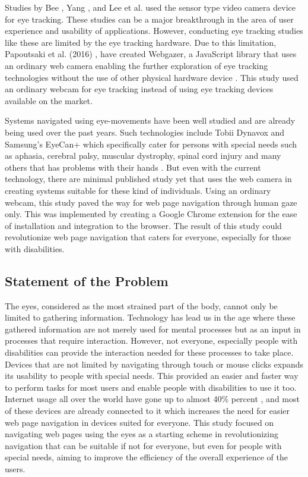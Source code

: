 \documentclass[journal]{./IEEE/IEEEtran}
\begin{document}
Studies by Bee \cite{Bee06etal},  Yang  \cite{Yang2016etal}, and  Lee et al.  \cite{Lee2015etal} used the sensor type video camera device for eye tracking. These studies can be a major breakthrough in the area of user experience and usability of applications. However, conducting eye tracking studies like these are limited by the eye tracking hardware. Due to this limitation, Papoutsaki et al. (2016) , have created Webgazer, a JavaScript library that uses an ordinary web camera enabling the further exploration of eye tracking technologies without the use of other physical hardware device \cite{papoutsaki2016webgazer}. This study used an ordinary webcam for eye tracking instead of using eye tracking devices available on the market.

Systems navigated using eye-movements have been well studied and are already being used over the past years. Such technologies include Tobii Dynavox and Samsung’s EyeCan+  which specifically cater for persons with special needs such as aphasia, cerebral palsy, muscular dystrophy, spinal cord injury and many others that has problems with their hands \cite{matos_2010}. But even with the current technology, there are minimal published study yet that uses the web camera in creating systems suitable for these kind of individuals. Using an ordinary webcam, this study  paved the way for web page navigation through human gaze only. This was implemented by creating a Google Chrome extension for the ease of installation and integration to the browser. The result of this study could revolutionize web page navigation that caters for everyone, especially for those with disabilities. 


\subsection{Statement of the Problem}

The eyes, considered as the most strained part of the body, cannot only  be limited to gathering information. Technology has lead us in the age where these gathered information are not merely used for mental processes but as an input in processes that require interaction. However, not everyone, especially people with disabilities can provide the interaction needed for these processes to take place. Devices that are not limited by navigating through touch or mouse clicks expands its usability to people with special needs. This  provided an easier and faster way to perform tasks for most users and enable people with disabilities to use it too. Internet usage all over the world have gone up to almost 40\% percent \cite{hostingfacts.com_2016}, and most of these devices are already connected to it which increases the need for easier web page navigation in devices suited for everyone. This study  focused on navigating web pages using the eyes as a starting scheme in revolutionizing navigation that can be suitable if not for everyone, but even for people with special needs, aiming to improve the efficiency of the overall experience of the users. 
\end{document}
